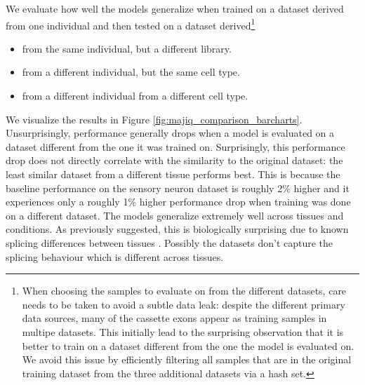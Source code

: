 We evaluate how well the models generalize when trained on a dataset derived from one individual and then tested on a dataset derived\footnote{When choosing the samples to evaluate on from the different datasets, care needs to be taken to avoid a subtle data leak: despite the different primary data sources, many of the cassette exons appear as training samples in multipe datasets. %
	This initially lead to the surprising observation that it is better to train on a dataset different from the one the model is evaluated on. We avoid this issue by efficiently filtering all samples that are in the original training dataset from the three additional datasets via a hash set.}
\begin{itemize}
	\item from the same individual, but a different library.
	\item from a different individual, but the same cell type.
	\item from a different individual from a different cell type.
\end{itemize}


We visualize the results in Figure \ref{fig:majiq_comparison_barcharts}.
Unsurprisingly, performance generally drops when a model is evaluated on a dataset different from the one it was trained on. Surprisingly, this performance drop does not directly correlate with the similarity to the original dataset: the least similar dataset from a different tissue performs best. 
This is because the baseline performance on the sensory neuron dataset is roughly 2\% higher and it experiences only a roughly 1\% higher performance drop when training was done on a different dataset. The models generalize extremely well across tissues and conditions. As previously suggested, this is biologically surprising due to known splicing differences between tissues \cite{crosstissuesplicing}. Possibly the datasets don't capture the splicing behaviour which is different across tissues.





